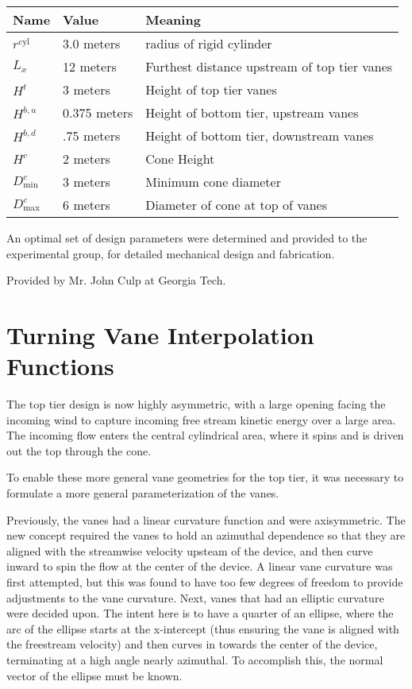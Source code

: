 \begin{table}[]
\centering
\begin{tabular}{lll}
Name                        & Value & Meaning                    \\
 \hline
$r^{\text{cyl}}$            &  3.0 meters  & radius of rigid cylinder \\
$L_x$                       &  12 meters  & Furthest distance upstream of top	 tier vanes \\
 $H^t    $                  &   3 meters  & Height of top tier vanes \\
 $H^{b,u}$                  & 0.375 meters & Height of bottom tier, upstream vanes \\
 $H^{b,d}$                  &   .75 meters& Height of bottom tier, downstream vanes \\
 $H^{c}$                    &   2 meters  & Cone Height \\
 $D^c_{\text{min}}    $     &   3 meters  & Minimum cone diameter \\
 $D^c_{\text{max}}    $     &   6 meters  & Diameter of cone at top of vanes\\
\end{tabular}
\end{table}

An optimal set of design parameters were determined and provided to the
experimental group, for detailed mechanical design and
fabrication.

Provided by Mr. John Culp at Georgia Tech. 

\section{Turning Vane Interpolation Functions}

The top tier design is now highly asymmetric, with a
large opening facing the incoming wind to capture incoming free stream
kinetic energy over a large area. The incoming flow enters the central
cylindrical area, where it spins and is driven out the top through the
cone. 

To enable these more general vane geometries for the top tier, it was
necessary to formulate a more general parameterization of the
vanes. 

Previously, the vanes had a linear curvature function and were
axisymmetric. The new concept required the vanes to hold an azimuthal
dependence so that they are aligned with the streamwise velocity upsteam 
of the device, and then curve inward to spin the flow at the center of
the device. A linear vane curvature was first attempted, but this was
found to have too few degrees of freedom to provide adjustments to the
vane curvature. Next, vanes that had an elliptic curvature were decided
upon. The intent here is to have a quarter of an ellipse, where the arc
of the ellipse starts at the x-intercept (thus ensuring the vane is
aligned with the freestream velocity) and then curves in towards the
center of the device, terminating at a high angle nearly azimuthal. To
accomplish this, the normal vector of the ellipse must be known. 

